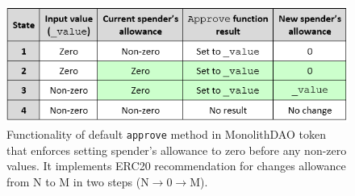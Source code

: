 
\begin{figure}[t]
	\centering
	\includegraphics[width=1.0\linewidth]{figures/multiple_withdrawal_09.png}
	\caption{Functionality of default \texttt{approve} method in MonolithDAO token that enforces setting spender's allowance to zero before any non-zero values. It implements ERC20 recommendation for changes allowance from N to M in two steps (N$\rightarrow$0$\rightarrow$M).\label{fig:dao}}
\end{figure}


